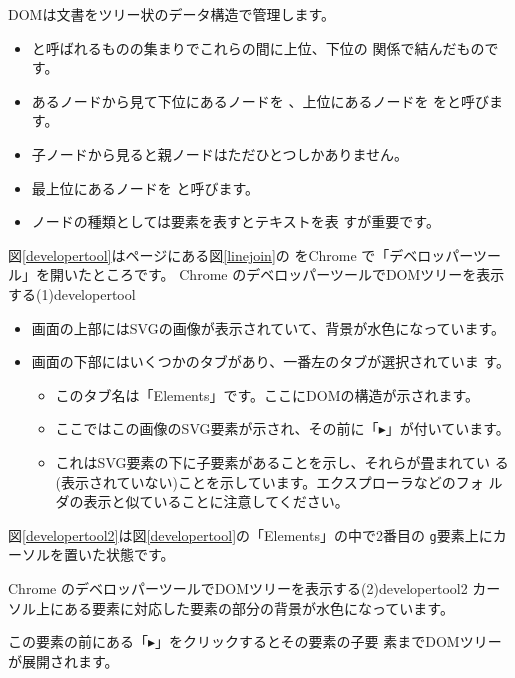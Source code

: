 DOMは文書をツリー状のデータ構造で管理します。
\begin{itemize}
 \item {}と呼ばれるものの集まりでこれらの間に上位、下位の
       関係で結んだものです。
 \item あるノードから見て下位にあるノードを
        、上位にあるノードを
       をと呼びます。
 \item 子ノードから見ると親ノードはただひとつしかありません。
 \item 最上位にあるノードを
       と呼びます。
 \item ノードの種類としては要素を表すとテキストを表
       すが重要です。
\end{itemize}
図\ref{developertool}は\pageref{linejoin}ページにある図\ref{linejoin}の\SVG 
をChrome で「デベロッパーツール」を開いたところです。
{Chrome のデベロッパーツールでDOMツリーを表示する(1)}{developertool}
\begin{itemize}
 \item 画面の上部にはSVGの画像が表示されていて、背景が水色になっています。
 \item 画面の下部にはいくつかのタブがあり、一番左のタブが選択されていま
			 す。
 \begin{itemize}
	\item このタブ名は「Elements」です。ここにDOMの構造が示されます。
	\item ここではこの画像のSVG要素が示され、その前に「$\blacktriangleright$」が付いています。
	\item これはSVG要素の下に子要素があることを示し、それらが畳まれてい
				る(表示されていない)ことを示しています。エクスプローラなどのフォ
				ルダの表示と似ていることに注意してください。
 \end{itemize}
\end{itemize}
%
\newpage
図\ref{developertool2}は図\ref{developertool}の「Elements」の中で2番目の
\texttt{g}要素上にカーソルを置いた状態です。

{Chrome のデベロッパーツールでDOMツリーを表示する(2)}{developertool2}
カーソル上にある要素に対応した要素の部分の背景が水色になっています。

この要素の前にある「$\blacktriangleright$」をクリックするとその要素の子要
素までDOMツリーが展開されます。

